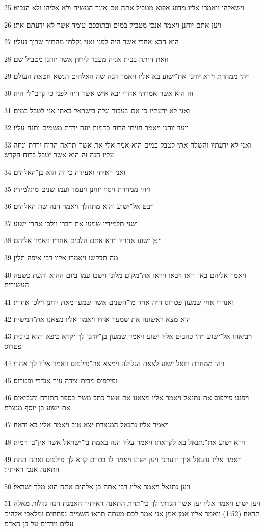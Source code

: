 \par 25 וישאלהו ויאמרו אליו מדוע אפוא מטביל אתה אם־אינך המשיח ולא אליהו ולא הנביא׃
\par 26 ויען אתם יוחנן ויאמר אנכי מטביל במים ובתוככם עומד אשר לא ידעתם אתו׃
\par 27 הוא הבא אחרי אשר היה לפני ואני נקלתי מהתיר שרוך נעליו׃
\par 28 וזאת היתה בבית אניה מעבר לירדן אשר יוחנן מטביל שם׃
\par 29 ויהי ממחרת וירא יוחנן את־ישוע בא אליו ויאמר הנה שה האלהים הנשא חטאת העולם׃
\par 30 זה הוא אשר אמרתי אחרי יבא איש אשר היה לפני כי קדם־לי היה׃
\par 31 ואני לא ידעתיו כי אם־בעבור יגלה בישראל באתי אני לטבל במים׃
\par 32 ויעד יוחנן ויאמר חזיתי הרוח כדמות יונה ירדת משמים ותנח עליו׃
\par 33 ואני לא ידעתיו והשלח אתי לטבל במים הוא אמר אלי את אשר־תראה הרוח ירדת ונחה עליו הנה זה הוא אשר יטבל ברוח הקדש׃
\par 34 ואני ראיתי ואעידה כי זה הוא בן־האלהים׃
\par 35 ויהי ממחרת ויסף יוחנן ויעמד ועמו שנים מתלמידיו׃
\par 36 ויבט אל־ישוע והוא מתהלך ויאמר הנה שה האלהים׃
\par 37 ושני תלמידיו שמעו את־דברו וילכו אחרי ישוע׃
\par 38 ויפן ישוע אחריו וירא אתם הלכים אחריו ויאמר אליהם׃
\par 39 מה־תבקשו ויאמרו אליו רבי איפה תלין׃
\par 40 ויאמר אליהם באו וראו ויבאו ויראו את־מקום מלונו וישבו עמו ביום ההוא והעת כשעה העשירית׃
\par 41 ואנדרי אחי שמעון פטרוס היה אחד מן־השנים אשר שמעו מאת יוחנן וילכו אחריו׃
\par 42 הוא מצא ראשונה את שמעון אחיו ויאמר אליו מצאנו את־המשיח׃
\par 43 ויביאהו אל־ישוע ויהי כהביט אליו ישוע ויאמר שמעון בן־יוחנן לך יקרא כיפא והוא ביונית פטרוס׃
\par 44 ויהי ממחרת ויואל ישוע לצאת הגלילה וימצא את־פילפוס ויאמר אליו לך אחרי׃
\par 45 ופילפוס מבית־צידה עיר אנדרי ופטרוס׃
\par 46 ויפגע פילפוס את־נתנאל ויאמר אליו מצאנו את אשר כתב משה בספר התורה והנביאים את־ישוע בן־יוסף מנצרת׃
\par 47 ויאמר אליו נתנאל המנצרת יצא טוב ויאמר אליו בא וראה׃
\par 48 וירא ישוע את־נתנאל בא לקראתו ויאמר עליו הנה באמת בן־ישראל אשר אין־בו רמיה׃
\par 49 ויאמר אליו נתנאל איך ידעתני ויען ישוע ויאמר לו בטרם קרא לך פילפוס ואתה תחת התאנה אנכי ראיתיך׃
\par 50 ויען נתנאל ויאמר אליו רבי אתה בן־אלהים אתה הוא מלך ישראל׃
\par 51 ויען ישוע ויאמר אליו יען אשר הגדתי לך כי־תחת התאנה ראיתיך האמנת הנה גדלות מאלה תראה׃ (1:52) ויאמר אליו אמן אמן אני אמר לכם מעתה תראו השמים נפתחים ומלאכי אלהים עלים וירדים על בן־האדם׃

